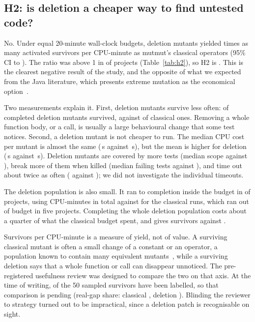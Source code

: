 \subsection{H2: is deletion a cheaper way to find untested code?}

No. Under equal 20-minute wall-clock budgets, deletion mutants yielded \HTwoRatio{} times as many activated survivors per CPU-minute as mutmut's classical operators (95\% CI \HTwoLo{} to \HTwoHi{}). The ratio was above 1 in \HTwoAbove{} of \HTwoN{} projects (Table~\ref{tab:h2}), so H2 is \textbf{\HTwoSupported}. This is the clearest negative result of the study, and the opposite of what we expected from the Java literature, which presents extreme mutation as the economical option~\cite{vera2018descartes,deng2013deletion}.

Two measurements explain it. First, deletion mutants survive less often: \HTwoDelSurvShare{} of completed deletion mutants survived, against \HTwoClsSurvShare{} of classical ones. Removing a whole function body, or a call, is usually a large behavioural change that some test notices. Second, a deletion mutant is not cheaper to run. The median CPU cost per mutant is almost the same (\HTwoDelCpuMedian{}\,s against \HTwoClsCpuMedian{}\,s), but the mean is higher for deletion (\HTwoDelCpuPerMutant{}\,s against \HTwoClsCpuPerMutant{}\,s). Deletion mutants are covered by more tests (median scope \HTwoDelScopeMedian{} against \HTwoClsScopeMedian{}), break more of them when killed (median \HTwoDelKillersMedian{} failing tests against \HTwoClsKillersMedian{}), and time out about twice as often (\HTwoDelTimeoutShare{} against \HTwoClsTimeoutShare{}); we did not investigate the individual timeouts.

The deletion population is also small. It ran to completion inside the budget in \HTwoExhausted{} of \HTwoN{} projects, using \HTwoDelCpuMin{} CPU-minutes in total against \HTwoClsCpuMin{} for the classical runs, which ran out of budget in five projects. Completing the whole deletion population costs about a quarter of what the classical budget spent, and gives \HTwoDelSurv{} survivors against \HTwoClsSurv{}.

Survivors per CPU-minute is a measure of yield, not of value. A surviving classical mutant is often a small change of a constant or an operator, a population known to contain many equivalent mutants~\cite{papadakis2019advances}, while a surviving deletion says that a whole function or call can disappear unnoticed. The pre-registered usefulness review was designed to compare the two on that axis. At the time of writing, \HTwoReviewed{} of the 50 sampled survivors have been labelled, so that comparison is pending (real-gap share: classical \HTwoClsRealGap{}, deletion \HTwoDelRealGap{}). Blinding the reviewer to strategy turned out to be impractical, since a deletion patch is recognisable on sight.


